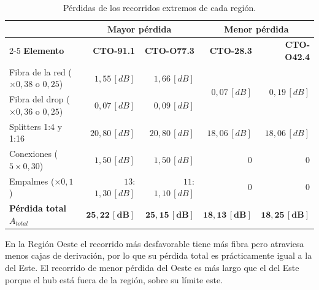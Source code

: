 \begin{table}[H]
    \centering
    \footnotesize
    \caption{Pérdidas de los recorridos extremos de cada región.}
    \label{tab:perdidas_recorridos}
    \begin{tabular}{|l|r|r|r|r|}
        \hline
        & \multicolumn{2}{c|}{\textbf{Mayor pérdida}} & \multicolumn{2}{c|}{\textbf{Menor pérdida}} \\
        \cline{2-5}
        \textbf{Elemento} & \textbf{CTO-91.1} & \textbf{CTO-O77.3} & \textbf{CTO-28.3} & \textbf{CTO-O42.4} \\
        \hline
        Fibra de la red ($\times 0{,}38$ o $0{,}25$) & $1{,}55 \, [dB]$ & $1{,}66 \, [dB]$ & \multirow{2}{*}{$0{,}07 \, [dB]$} & \multirow{2}{*}{$0{,}19 \, [dB]$} \\
        Fibra del drop ($\times 0{,}36$ o $0{,}25$) & $0{,}07 \, [dB]$ & $0{,}09 \, [dB]$ & & \\
        Splitters 1:4 y 1:16 & $20{,}80 \, [dB]$ & $20{,}80 \, [dB]$ & $18{,}06 \, [dB]$ & $18{,}06 \, [dB]$ \\
        Conexiones ($5 \times 0{,}30$) & $1{,}50 \, [dB]$ & $1{,}50 \, [dB]$ & $0$ & $0$ \\
        Empalmes ($\times 0{,}1$) & $13$: $1{,}30 \, [dB]$ & $11$: $1{,}10 \, [dB]$ & $0$ & $0$ \\
        \hline
        \textbf{Pérdida total $A_{total}$} & $\mathbf{25{,}22 \, [dB]}$ & $\mathbf{25{,}15 \, [dB]}$ & $\mathbf{18{,}13 \, [dB]}$ & $\mathbf{18{,}25 \, [dB]}$ \\
        \hline
    \end{tabular}
\end{table}

En la Región Oeste el recorrido más desfavorable tiene más fibra pero atraviesa menos cajas de derivación, por lo que su pérdida total es prácticamente igual a la del Este. El recorrido de menor pérdida del Oeste es más largo que el del Este porque el hub está fuera de la región, sobre su límite este.

